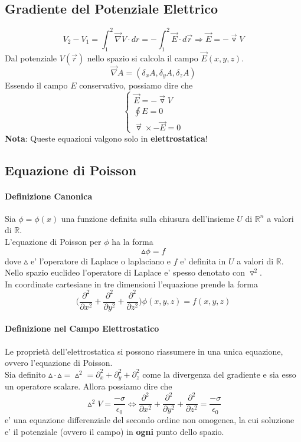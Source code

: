 \documentclass[a4paper, 10pt]{article}
\begin{document}
		\subsection{Gradiente del Potenziale Elettrico}
			\[
				V_2 - V_1 = \int_{1}^2 \overrightarrow{\nabla} V \cdot dr = 
				- \int_{1}^2 \overrightarrow{E} \cdot d\overrightarrow{r} \Rightarrow \overrightarrow{E} = 
				- \overrightarrow{\triangledown} V 
			\]
			Dal potenziale $V(\overrightarrow{r})$ nello spazio si calcola il campo $\overrightarrow{E}(x,y,z)$.
			\[ \overrightarrow{\nabla} A = (\delta_x A, \delta_y A, \delta_z A) \]
			Essendo il campo $E$ conservativo, possiamo dire che 
			\[ \begin{cases} 
				\overrightarrow{E} = -\overrightarrow{\triangledown} V \\
				\oint E = 0 \\
				\overrightarrow{\triangledown} \times -\overrightarrow{E} = 0
				\end{cases}
			\]
			\textbf{Nota}: Queste equazioni valgono solo in \textbf{elettrostatica}!
			
		\subsection{Equazione di Poisson}
			\paragraph*{Definizione Canonica}
			Sia $\phi = \phi(x)$ una funzione definita sulla chiusura dell'insieme $U$ di $\mathbb{R}^n$ a valori 
			di $\mathbb{R}$.\\
			L'equazione di Poisson per $\phi$ ha la forma 
			\[ \vartriangle \phi = f \] dove $\vartriangle$ e' l'operatore di Laplace o laplaciano e $f$ e' definita in $U$
			a valori di $\mathbb{R}$. Nello spazio euclideo l'operatore di Laplace e' spesso denotato con $\triangledown ^2$.\\
			In coordinate cartesiane in tre dimensioni l'equazione prende la forma 
			\[  \big (  \frac{\partial^2}{\partial x^2} + \frac{\partial^2}{\partial y^2} + \frac{\partial^2}{\partial z^2} \bigr )
			\phi(x,y,z) = f(x,y,z) \]
			\paragraph*{Definizione nel Campo Elettrostatico}
			Le proprietà dell'elettrostatica si possono riassumere in una unica equazione, ovvero l'equazione di Poisson.\\
			Sia definito $\vartriangle \cdot \vartriangle = \vartriangle ^2 = \partial_x ^2 + \partial_y ^2 + \partial_z ^ 2$ come la 
			divergenza del gradiente e sia esso un operatore scalare. Allora possiamo dire che 
			\[ \vartriangle^2 V = \frac{-\sigma}{\epsilon_0}  \Leftrightarrow 
			 \frac{\partial^2}{\partial x^2} + \frac{\partial^2}{\partial y^2} + \frac{\partial^2}{\partial z^2} = 
			 \frac{-\sigma}{\epsilon_0}
			\]
			e' una equazione differenziale del secondo ordine non omogenea, la cui soluzione e' il potenziale 
			(ovvero il campo) in \textbf{ogni} punto dello spazio.
\end{document}
